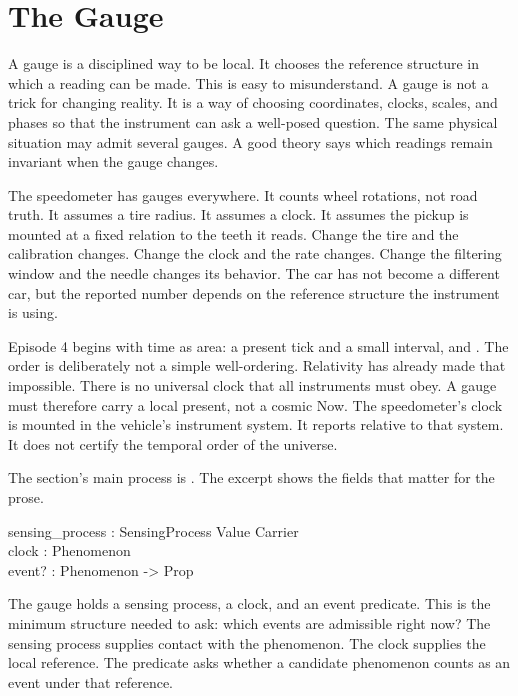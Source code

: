 \section{The Gauge}
\label{se:the-gauge}

A gauge is a disciplined way to be local. It chooses the reference structure in
which a reading can be made. This is easy to misunderstand. A gauge is not a
trick for changing reality. It is a way of choosing coordinates, clocks,
scales, and phases so that the instrument can ask a well-posed question. The
same physical situation may admit several gauges. A good theory says which
readings remain invariant when the gauge changes.

The speedometer has gauges everywhere. It counts wheel rotations, not road
truth. It assumes a tire radius. It assumes a clock. It assumes the pickup is
mounted at a fixed relation to the teeth it reads. Change the tire and the
calibration changes. Change the clock and the rate changes. Change the
filtering window and the needle changes its behavior. The car has not become a
different car, but the reported number depends on the reference structure the
instrument is using.

Episode 4 begins with time as area: a present tick and a small interval,
 and . The order is deliberately not a simple well-ordering.
Relativity has already made that impossible. There is no universal clock that
all instruments must obey. A gauge must therefore carry a local present, not a
cosmic Now. The speedometer's clock is mounted in the vehicle's instrument
system. It reports relative to that system. It does not certify the temporal
order of the universe.

The section's main process is . The excerpt shows the
fields that matter for the prose.

\begin{leancode}
sensing\_process : SensingProcess Value Carrier\\
clock : Phenomenon\\
event? : Phenomenon -> Prop
\end{leancode}

The gauge holds a sensing process, a clock, and an event predicate. This is
the minimum structure needed to ask: which events are admissible right now?
The sensing process supplies contact with the phenomenon. The clock supplies
the local reference. The predicate asks whether a candidate phenomenon counts
as an event under that reference.

